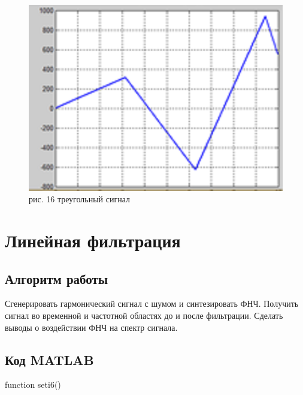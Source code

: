 \documentclass[10pt,a4paper]{report}
\begin{document}
\begin{figure}
\begin{center}
\includegraphics[angle=0, scale = 0.9]{16.png}\newline
рис. 16    треугольный сигнал\newline
\end{center}
\end{figure}
\chapter{Линейная фильтрация}
\section{Алгоритм работы}
Сгенерировать гармонический сигнал с шумом и синтезировать ФНЧ. Получить сигнал во временной и частотной областях до и после фильтрации. Сделать выводы о воздействии ФНЧ на  спектр сигнала.
\section{Код MATLAB}
function seti6() \newline
\end{document}
